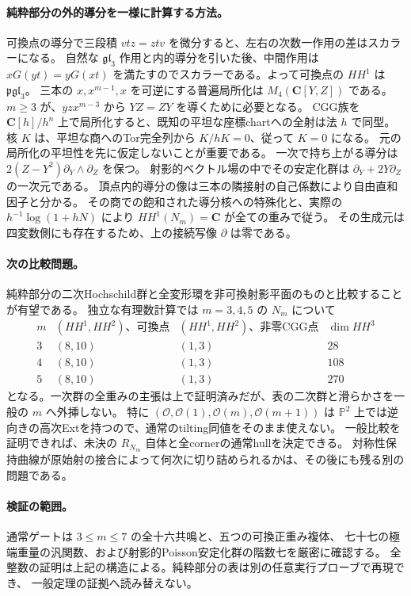 \paragraph{純粋部分の外的導分を一様に計算する方法。}
可換点の導分で三段積 $vtz=ztv$ を微分すると、左右の次数一作用の差はスカラーになる。
自然な $\mathfrak{gl}_3$ 作用と内的導分を引いた後、中間作用は
$xG(yt)=yG(xt)$ を満たすのでスカラーである。よって可換点の $HH^1$ は $\mathfrak{pgl}_3$。
三本の $x,x^{m-1},x$ を可逆にする普遍局所化は $M_4(\mathbf C[Y,Z])$ である。
$m\ge3$ が、$yzx^{m-3}$ から $YZ=ZY$ を導くために必要となる。
CGG族を $\mathbf C[h]/h^n$ 上で局所化すると、既知の平坦な座標chartへの全射は法 $h$ で同型。
核 $K$ は、平坦な商へのTor完全列から $K/hK=0$、従って $K=0$ になる。
元の局所化の平坦性を先に仮定しないことが重要である。
一次で持ち上がる導分は $2(Z-Y^2)\partial_Y\wedge\partial_Z$ を保つ。
射影的ベクトル場の中でその安定化群は $\partial_Y+2Y\partial_Z$ の一次元である。
頂点内的導分の像は三本の隣接射の自己係数により自由直和因子と分かる。
その商での飽和された導分核への特殊化と、実際の $h^{-1}\log(1+hN)$ により
$HH^1(N_m)=\mathbf C$ が全ての重みで従う。
その生成元は四変数側にも存在するため、上の接続写像 $\partial$ は零である。

\paragraph{次の比較問題。}
純粋部分の二次Hochschild群と全変形環を非可換射影平面のものと比較することが有望である。
独立な有理数計算では $m=3,4,5$ の $N_m$ について
\[
\begin{array}{c|c|c|c}
 m & (HH^1,HH^2)\text{、可換点}&(HH^1,HH^2)\text{、非零CGG点}&\dim HH^3\\\hline
 3&(8,10)&(1,3)&28\\
 4&(8,10)&(1,3)&108\\
 5&(8,10)&(1,3)&270
\end{array}
\]
となる。一次群の全重みの主張は上で証明済みだが、表の二次群と滑らかさを一般の $m$ へ外挿しない。
特に $(\mathcal O,\mathcal O(1),\mathcal O(m),\mathcal O(m+1))$ は
$\mathbb P^2$ 上では逆向きの高次Extを持つので、通常のtilting同値をそのまま使えない。
一般比較を証明できれば、未決の $R_{N_m}$ 自体と全cornerの通常hullを決定できる。
対称性保持曲線が原始射の接合によって何次に切り詰められるかは、その後にも残る別の問題である。

\paragraph{検証の範囲。}
通常ゲートは $3\le m\le7$ の全十六共鳴と、五つの可換正重み複体、
七十七の極端重量の汎関数、および射影的Poisson安定化群の階数七を厳密に確認する。
全整数の証明は上記の構造による。純粋部分の表は別の任意実行プローブで再現でき、
一般定理の証拠へ読み替えない。
